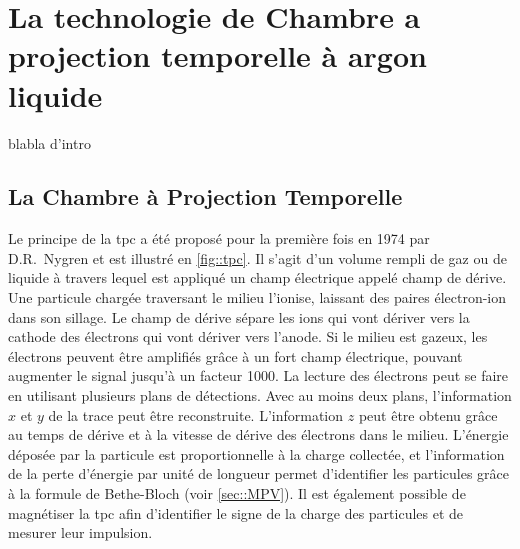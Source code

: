 
\chapter{La technologie de Chambre a projection temporelle à argon liquide}

  blabla d'intro
    
  \section{La Chambre à Projection Temporelle}
    Le principe de la \acrfull{tpc} a été proposé pour la première fois en 1974 par D.R.~Nygren\cite{Nygren1974} et est illustré en \autoref{fig::tpc}. Il s'agit d'un volume rempli de gaz ou de liquide à travers lequel est appliqué un champ électrique appelé champ de dérive. Une particule chargée traversant le milieu l'ionise, laissant des paires électron-ion dans son sillage. Le champ de dérive sépare les ions qui vont dériver vers la cathode des électrons qui vont dériver vers l'anode. Si le milieu est gazeux, les électrons peuvent être amplifiés grâce à un fort champ électrique, pouvant augmenter le signal jusqu'à un facteur 1000. La lecture des électrons peut se faire en utilisant plusieurs plans de détections. Avec au moins deux plans, l'information $x$ et $y$ de la trace peut être reconstruite. L'information $z$ peut être obtenu grâce au temps de dérive et à la vitesse de dérive des électrons dans le milieu. L'énergie déposée par la particule est proportionnelle à la charge collectée, et l'information de la perte d'énergie par unité de longueur permet d'identifier les particules grâce à la formule de Bethe-Bloch (voir \autoref{sec::MPV}). Il est également possible de magnétiser la \gls{tpc} afin d'identifier le signe de la charge des particules et de mesurer leur impulsion.

